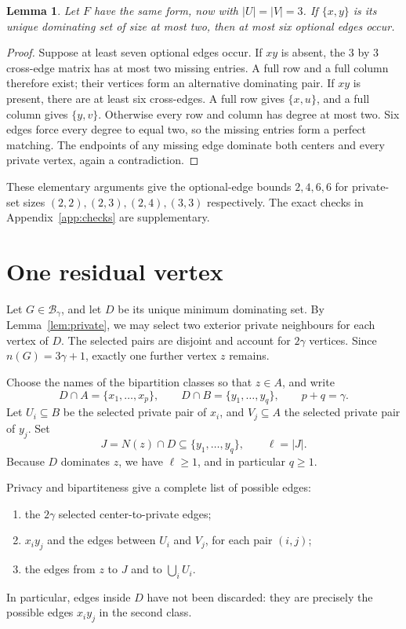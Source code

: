\documentclass[11pt]{article}
\newtheorem{lemma}[theorem]{Lemma}
\theoremstyle{definition}
\theoremstyle{remark}
\begin{document}
\begin{lemma}\label{lem:eight33}
Let $F$ have the same form, now with $|U|=|V|=3$. If $\{x,y\}$ is its unique
dominating set of size at most two, then at most six optional edges occur.
\end{lemma}

\begin{proof}
Suppose at least seven optional edges occur. If $xy$ is absent, the $3$ by
$3$ cross-edge matrix has at most two missing entries. A full row and a
full column therefore exist; their vertices form an alternative dominating
pair. If $xy$ is present, there are at least six cross-edges. A full row
gives $\{x,u\}$, and a full column gives $\{y,v\}$. Otherwise every row and
column has degree at most two. Six edges force every degree to equal two,
so the missing entries form a perfect matching. The endpoints of any
missing edge dominate both centers and every private vertex, again a
contradiction.
\end{proof}

These elementary arguments give the optional-edge bounds $2,4,6,6$ for
private-set sizes $(2,2),(2,3),(2,4),(3,3)$ respectively. The exact checks
in Appendix~\ref{app:checks} are supplementary.

\section{One residual vertex}\label{sec:upper}

Let $G\in\mathcal B_\gamma$, and let $D$ be its unique minimum dominating set.
By Lemma~\ref{lem:private}, we may select two exterior private neighbours for
each vertex of $D$. The selected pairs are disjoint and account for $2\gamma$
vertices. Since $n(G)=3\gamma+1$, exactly one further vertex $z$ remains.

Choose the names of the bipartition classes so that $z\in A$, and write
\[
 D\cap A=\{x_1,\ldots,x_p\},\qquad
 D\cap B=\{y_1,\ldots,y_q\},\qquad p+q=\gamma.
\]
Let $U_i\subseteq B$ be the selected private pair of $x_i$, and
$V_j\subseteq A$ the selected private pair of $y_j$. Set
\[
 J=N(z)\cap D\subseteq\{y_1,\ldots,y_q\},\qquad \ell=|J|.
\]
Because $D$ dominates $z$, we have $\ell\ge1$, and in particular $q\ge1$.

Privacy and bipartiteness give a complete list of possible edges:
\begin{enumerate}
\item the $2\gamma$ selected center-to-private edges;
\item $x_iy_j$ and the edges between $U_i$ and $V_j$, for each pair $(i,j)$;
\item the edges from $z$ to $J$ and to $\bigcup_iU_i$.
\end{enumerate}
In particular, edges inside $D$ have not been discarded: they are precisely
the possible edges $x_iy_j$ in the second class.
\end{document}
